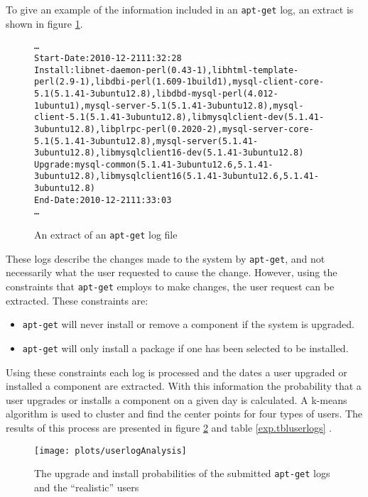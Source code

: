 To give an example of the information included in an \texttt{apt-get} log, an extract is shown in figure \ref{aptlog}.
\begin{figure}[htp]
\begin{center}
\begin{alltt}
\ldots
Start-Date: 2010-12-21 11:32:28
Install: libnet-daemon-perl (0.43-1), libhtml-template-perl (2.9-1), libdbi-perl (1.609-1build1), mysql-client-core-5.1 (5.1.41-3ubuntu12.8), libdbd-mysql-perl (4.012-1ubuntu1), mysql-server-5.1 (5.1.41-3ubuntu12.8), mysql-client-5.1 (5.1.41-3ubuntu12.8), libmysqlclient-dev (5.1.41-3ubuntu12.8), libplrpc-perl (0.2020-2), mysql-server-core-5.1 (5.1.41-3ubuntu12.8), mysql-server (5.1.41-3ubuntu12.8), libmysqlclient16-dev (5.1.41-3ubuntu12.8)
Upgrade: mysql-common (5.1.41-3ubuntu12.6, 5.1.41-3ubuntu12.8), libmysqlclient16 (5.1.41-3ubuntu12.6, 5.1.41-3ubuntu12.8)
End-Date: 2010-12-21 11:33:03
\ldots
\end{alltt}
\caption{An extract of an \texttt{apt-get} log file}
\label{aptlog}
\end{center}
\end{figure}

These logs describe the changes made to the system by \texttt{apt-get}, and not necessarily what the user requested to cause the change.
However, using the constraints that \texttt{apt-get} employs to make changes, the user request can be extracted.
These constraints are:
\begin{itemize}
  \item \texttt{apt-get} will never install or remove a component if the system is upgraded.
  \item \texttt{apt-get} will only install a package if one has been selected to be installed.
\end{itemize}
Using these constraints each log is processed and the dates a user upgraded or installed a component are extracted.
With this information the probability that a user upgrades or installs a component on a given day is calculated.
A k-means algorithm is used to cluster and find the center points for four types of users.
The results of this process are presented in figure \ref{exp.figuserlogs} and table \ref{exp.tbluserlogs} .

\begin{figure}[htp]
\begin{center}
  \texttt{[image: plots/userlogAnalysis]}
  \caption{The upgrade and install probabilities of the submitted \texttt{apt-get} logs and the ``realistic'' users}
  \label{exp.figuserlogs}
\end{center}
\end{figure}

